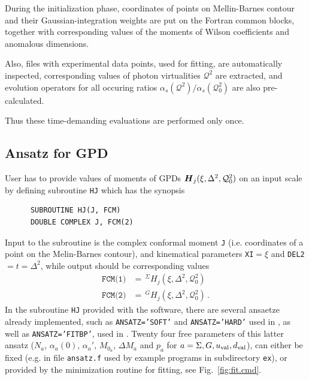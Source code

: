 \documentclass[12pt]{article}
\begin{document}
During the initialization phase, coordinates of points on Mellin-Barnes contour and 
their Gaussian-integration weights
are put on the Fortran common blocks, together with corresponding values of
the moments of Wilson coefficients and anomalous dimensions. 

Also, files with experimental data points, used for fitting, are automatically
inspected, corresponding values of photon virtualities $\mathcal{Q}^2$ are
extracted, and evolution operators for all occuring ratios
$\alpha_{s}(\mathcal{Q}^2)/\alpha_{s}(\mathcal{Q}^{2}_0)$ are also pre-calculated.

Thus these time-demanding evaluations are performed only once.


\subsection{Ansatz for GPD}
\label{ssect:ansatz}

User has to provide values of moments of GPDs $\mbox{\boldmath $H$}_{j} 
(\xi,\Delta^2,\mathcal{Q}_{0}^2)$
on an input scale by defining subroutine \texttt{HJ} which has the synopsis
\begin{verbatim}
      SUBROUTINE HJ(J, FCM)
      DOUBLE COMPLEX J, FCM(2)
\end{verbatim}
Input to the subroutine is the complex conformal moment \texttt{J} (i.e. coordinates of a point
on the Melin-Barnes contour), and kinematical parameters \texttt{XI}$=\xi$ and
\texttt{DEL2}$=t=\Delta^2$,
while output should be corresponding values
\begin{align}
\texttt{FCM(1)}& =\, ^{\Sigma}\!H_{j} (\xi,\Delta^2,\mathcal{Q}_{0}^2)  \\
\texttt{FCM(2)}& =\, ^{G}\!H_{j}(\xi,\Delta^2,\mathcal{Q}_{0}^2) \,.
\label{eq:FCM}
\end{align}
In the subroutine \texttt{HJ} provided with the software, there are several ansaetze 
already implemented, such as \texttt{ANSATZ='SOFT'} and \texttt{ANSATZ='HARD'}
used in \cite{Kumericki:2006xx}, as well as \texttt{ANSATZ='FITBP'}, used in
\cite{Kumericki:2007sa}.
Twenty four free parameters of this latter ansatz ($N_a$, $\alpha_{a}(0)$, $\alpha_{a}'$,
$M_{0_a}$, $\Delta M_a$ and $p_a$ for  $a = \Sigma, G, u_{\rm val}, d_{\rm val}$),
can either be fixed (e.g. in file \texttt{ansatz.f} used by example programs in
subdirectory \texttt{ex}), or provided by the minimization routine for fitting, see
Fig.~\ref{fig:fit.cmd}.
\end{document}
